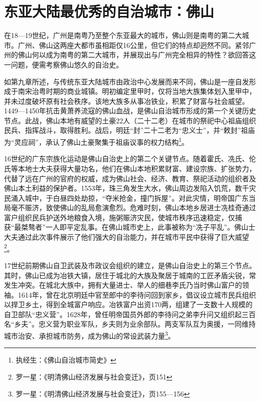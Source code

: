 \section{东亚大陆最优秀的自治城市：佛山}

\indent 在18—19世纪，广州是南粤乃至整个东亚最大的城市，佛山则是南粤的第二大城市。广州、佛山这两座大都市虽相距仅16公里，但它们的特点却迥然不同。紧邻广州的佛山何以成为南粤的第二大城市，并展现出与广州完全相异的特性？欲回答这一问题，便需考察佛山悠久的自治史。

如第九章所述，与传统东亚大陆城市由政治中心发展而来不同，佛山是一座自发形成于南宋治粤时期的商业城镇。明初编定里甲时，仅将当地大族集体划入里甲中，并未过度破坏原有社会秩序。该地大族多从事冶铁业，积累了财富与社会威望。1449—1450年抗击黄萧养流寇的佛山血战，是佛山自治城市形成的第一个关键历史节点。此战，佛山本地有威望的土豪22人（二十二老）在城市的祭祀中心祖庙组织民兵、指挥战斗，取得胜利。战后，明廷“封”二十二老为“忠义士”，并“敕封”祖庙为“灵应祠”，承认了佛山土豪聚集于祖庙议事的权力结构\footnote{执经生：《佛山自治城市简史》}。

16世纪的广东宗族化运动是佛山自治史上的第二个关键节点。随着霍氏、冼氏、伦氏等本地士大夫获得大量功名，他们在佛山本地积累财富、建设宗族、扩张势力，代替了远在广州的官府的权威，成为佛山社会、经济、教育、祭祀活动的组织者及佛山本土利益的保护者。1553年，珠三角发生大水，佛山周边发陷入饥荒，数千灾民涌入城中，于白昼四处劫掠，“夺米抢金，撞门拆屋”。对此灾情，明帝国广东当局毫不赈济，致使佛山的乱局愈演愈烈。危难时刻，佛山本地乡居进士冼桂奇通过富户组织民兵护送外地粮食入境，施粥赈济灾民，使城市秩序迅速稳定，仅捕获“最桀骜者”一人即平定乱事。在佛山城市史上，此事被称为“冼子平乱”。佛山士大夫通过此次事件展示了他们强大的自治能力，并在城市平民中获得了巨大威望\footnote{罗一星：《明清佛山经济发展与社会变迁》，页151}。

17世纪前期佛山自卫武装及市政议会组织的建立，是佛山自治史上的第三个节点。其时，佛山已成为冶铁大镇，居住于城北的大族及聚居于城南的工匠矛盾尖锐，常发生冲突。在城北大族中，拥有大量进士、举人的细巷李氏乃当时佛山富户的领袖。1614年，曾在北京明廷中官至郎中的李待问回到家乡，倡议设立城市民兵组织以捍卫乡土，得到全城富户响应。冶铁富户出资170两，组建了一支数十人规模的自卫部队“忠义营”。1628年，曾任明帝国员外郎的李待问之弟李升问又组织起三百名“乡夫”。忠义营为职业军队，乡夫则为业余部队。两支军队互为奥援，一同维持城市治安、承担城市防务，成为佛山的常设武装力量\footnote{罗一星：《明清佛山经济发展与社会变迁》，页155—156}。

